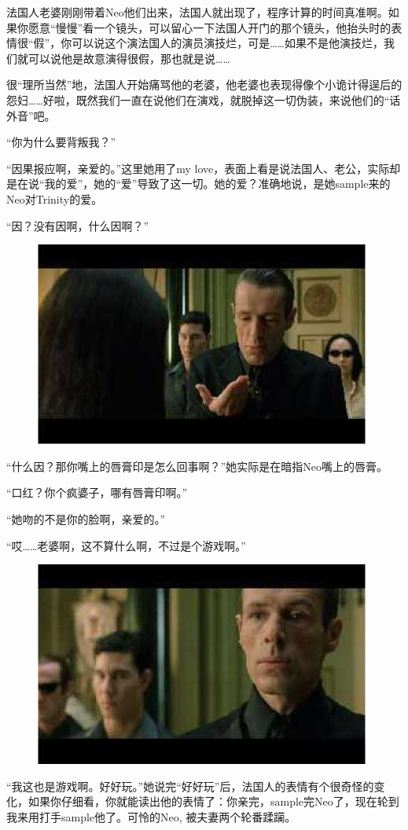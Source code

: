 \documentclass{ctexart}
\begin{document}
法国人老婆刚刚带着Neo他们出来，法国人就出现了，程序计算的时间真准啊。如果你愿意“慢慢”看一个镜头，可以留心一下法国人开门的那个镜头，他抬头时的表情很“假”，你可以说这个演法国人的演员演技烂，可是……如果不是他演技烂，我们就可以说他是故意演得很假，那也就是说……

很“理所当然”地，法国人开始痛骂他的老婆，他老婆也表现得像个小诡计得逞后的怨妇……好啦，既然我们一直在说他们在演戏，就脱掉这一切伪装，来说他们的“话外音”吧。

“你为什么要背叛我？”

“因果报应啊，亲爱的。”这里她用了my love，表面上看是说法国人、老公，实际却是在说“我的爱”，她的“爱”导致了这一切。她的爱？准确地说，是她sample来的Neo对Trinity的爱。

“因？没有因啊，什么因啊？”

\begin{figure}[htb]
\centering
\includegraphics[width=0.5\linewidth]{fig/read_reloaded-117}
\end{figure}

“什么因？那你嘴上的唇膏印是怎么回事啊？”她实际是在暗指Neo嘴上的唇膏。

“口红？你个疯婆子，哪有唇膏印啊。”

“她吻的不是你的脸啊，亲爱的。”

“哎……老婆啊，这不算什么啊，不过是个游戏啊。”

\begin{figure}[htb]
\centering
\includegraphics[width=0.5\linewidth]{fig/read_reloaded-118}
\end{figure}

“我这也是游戏啊。好好玩。”她说完“好好玩”后，法国人的表情有个很奇怪的变化，如果你仔细看，你就能读出他的表情了：你亲完，sample完Neo了，现在轮到我来用打手sample他了。可怜的Neo, 被夫妻两个轮番蹂躏。
\end{document}
